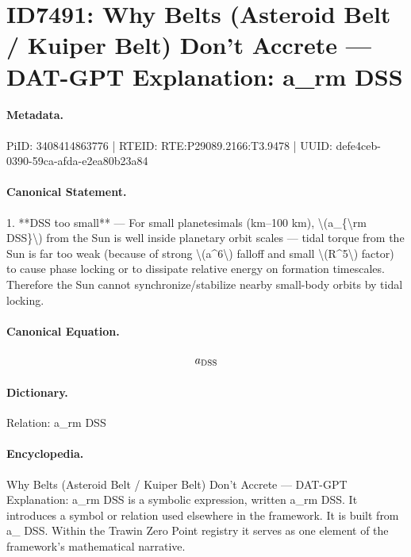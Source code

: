 \section*{ID7491: Why Belts (Asteroid Belt / Kuiper Belt) Don’t Accrete — DAT-GPT Explanation: a\_rm DSS}
\paragraph{Metadata.}
PiID: 3408414863776 | RTEID: RTE:P29089.2166:T3.9478 | UUID: defe4ceb-0390-59ca-afda-e2ea80b23a84

\paragraph{Canonical Statement.}
1. **DSS too small** — For small planetesimals (km–100 km), \textbackslash{}(a\_\{\textbackslash{}rm DSS\}\textbackslash{}) from the Sun is well inside planetary orbit scales — tidal torque from the Sun is far too weak (because of strong \textbackslash{}(a\textasciicircum{}6\textbackslash{}) falloff and small \textbackslash{}(R\textasciicircum{}5\textbackslash{}) factor) to cause phase locking or to dissipate relative energy on formation timescales. Therefore the Sun cannot synchronize/stabilize nearby small-body orbits by tidal locking.

\paragraph{Canonical Equation.}
\[
a_{\rm DSS}
\]

\paragraph{Dictionary.}
Relation: a\_rm DSS

\paragraph{Encyclopedia.}
Why Belts (Asteroid Belt / Kuiper Belt) Don’t Accrete — DAT-GPT Explanation: a\_rm DSS is a symbolic expression, written a\_rm DSS. It introduces a symbol or relation used elsewhere in the framework. It is built from a\_ DSS. Within the Trawin Zero Point registry it serves as one element of the framework's mathematical narrative.
